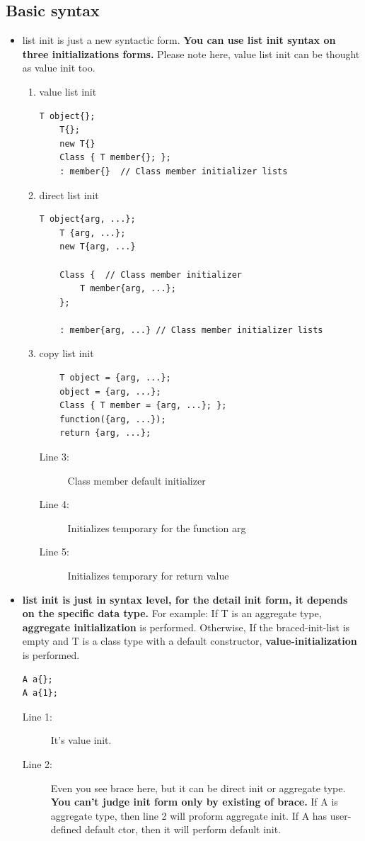 \documentclass[a4paper,11pt,twoside]{book}
\begin{document}
\subsection{Basic syntax}
\begin{itemize}
		
	\item list init is just a new syntactic form. \textbf{You can use list init syntax on three initializations forms.} Please note here, value list init can be thought as value init too.  
	\begin{enumerate}
		\item value list init
\begin{lstlisting}[numbers=none]
	T object{};
	T{};
	new T{}
	Class { T member{}; };
	: member{}  // Class member initializer lists
\end{lstlisting}
		\item direct list init
\begin{lstlisting}[numbers=none]
	T object{arg, ...};
	T {arg, ...};
	new T{arg, ...}
	
	Class {  // Class member initializer
		T member{arg, ...}; 
	};
			
	: member{arg, ...} // Class member initializer lists
\end{lstlisting}
		\item copy list init
\begin{lstlisting}
	T object = {arg, ...};
	object = {arg, ...};
	Class { T member = {arg, ...}; };
	function({arg, ...}); 
	return {arg, ...};  
\end{lstlisting}
		\begin{description}
			\item[Line 3:] Class member default initializer
			\item[Line 4:] Initializes temporary for the function arg
			\item[Line 5:] Initializes temporary for return value
		\end{description}
	\end{enumerate}
	
	\item \textbf{list init is just in syntax level, for the detail init form, it depends on the specific data type.}  For example: If T is an aggregate type, \textbf{aggregate initialization} is performed. Otherwise, If the braced-init-list is empty and T is a class type with a default constructor, \textbf{value-initialization} is performed.
	
\begin{lstlisting}
A a{};
A a{1};	
\end{lstlisting}
	\begin{description}
		\item[Line 1:] It's value init.
		\item[Line 2:] Even you see brace here, but it can be direct init or aggregate type. \textbf{You can't judge init form only by existing of brace.} If A is aggregate type, then line 2 will proform aggregate init. If A has user-defined default ctor, then it will perform default init. 
	\end{description}
	

\end{itemize}
\end{document}
